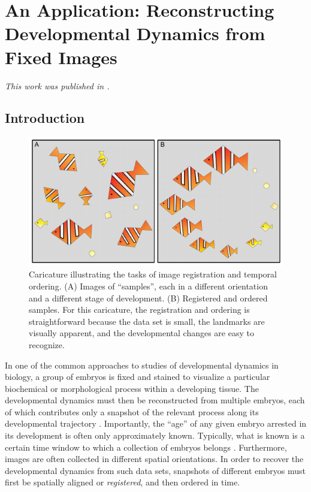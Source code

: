 
\chapter{An Application: Reconstructing Developmental Dynamics from Fixed Images \label{ch:drosophila}}

\graphicspath{{ch-drosophila/figures/}}

{\em This work was published in \citep{dsilva2015temporal}.}

\section{Introduction}

\begin{figure}[t]
\centering
\includegraphics{fig1}
\caption[Caricature illustrating the tasks of image registration and temporal ordering]{Caricature illustrating the tasks of image registration and temporal ordering. (A) Images of ``samples'', each in a different orientation and a different stage of development. (B) Registered and ordered samples. For this caricature, the registration and ordering is straightforward because the data set is small, the landmarks are visually apparent, and the developmental changes are easy to recognize.}
\label{fig:fish}
\end{figure}

In one of the common approaches to studies of developmental dynamics in biology, a group of embryos is fixed and stained to visualize a particular biochemical or morphological process within a developing tissue.
%
The developmental dynamics must then be reconstructed from multiple embryos, each of which contributes only a snapshot of the relevant process along its developmental trajectory \citep{jaeger2004dynamic, peter2011gene, fowlkes2008quantitative}.
%
Importantly, the ``age'' of any given embryo arrested in its development is often only approximately known.
%
Typically, what is known is
a certain time window to which a collection of embryos belongs \citep{ng2012large, richardson2014emage, castro2009automatic}.
%
Furthermore, images are often collected in different spatial orientations.
%
In order to recover the developmental dynamics from such data sets, snapshots of different embryos must first be spatially aligned or {\em registered}, and then ordered in time.


